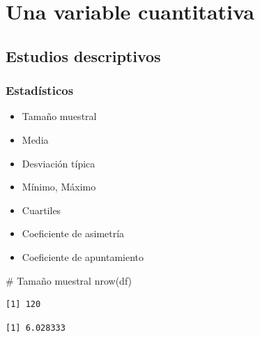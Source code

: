 \documentclass[
  a4paper,
]{scrreport}
\newenvironment{Shaded}{\begin{snugshade}}{\end{snugshade}}
\newcommand{\AttributeTok}[1]{\textcolor[rgb]{0.40,0.45,0.13}{#1}}
\newcommand{\CommentTok}[1]{\textcolor[rgb]{0.37,0.37,0.37}{#1}}
\newcommand{\ConstantTok}[1]{\textcolor[rgb]{0.56,0.35,0.01}{#1}}
\newcommand{\FunctionTok}[1]{\textcolor[rgb]{0.28,0.35,0.67}{#1}}
\newcommand{\NormalTok}[1]{\textcolor[rgb]{0.00,0.23,0.31}{#1}}
\newcommand{\SpecialCharTok}[1]{\textcolor[rgb]{0.37,0.37,0.37}{#1}}
\providecommand{\tightlist}{%
  \setlength{\itemsep}{0pt}\setlength{\parskip}{0pt}}\usepackage{longtable,booktabs,array}
\theoremstyle{definition}
\theoremstyle{definition}
\theoremstyle{remark}
\begin{document}
\hypertarget{una-variable-cuantitativa}{%
\section{Una variable cuantitativa}\label{una-variable-cuantitativa}}

\hypertarget{estudios-descriptivos}{%
\subsection{Estudios descriptivos}\label{estudios-descriptivos}}

\hypertarget{estaduxedsticos}{%
\subsubsection{Estadísticos}\label{estaduxedsticos}}

\begin{itemize}
\tightlist
\item
  Tamaño muestral
\item
  Media
\item
  Desviación típica
\item
  Mínimo, Máximo
\item
  Cuartiles
\item
  Coeficiente de asimetría
\item
  Coeficiente de apuntamiento
\end{itemize}

\begin{Shaded}
\begin{Highlighting}[]
\CommentTok{\# Tamaño muestral}
\FunctionTok{nrow}\NormalTok{(df)}
\end{Highlighting}
\end{Shaded}

\begin{verbatim}
[1] 120
\end{verbatim}

\begin{Shaded}
\end{Shaded}

\begin{verbatim}
[1] 6.028333
\end{verbatim}
\end{document}
